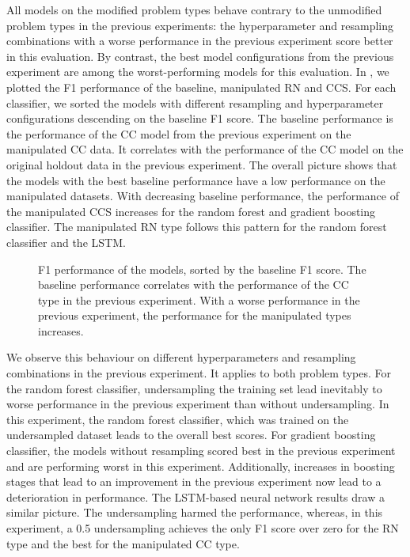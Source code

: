 All models on the modified problem types behave contrary to the unmodified problem types in the previous experiments: the hyperparameter and resampling combinations with a worse performance in the previous experiment score better in this evaluation. By contrast, the best model configurations from the previous experiment are among the worst-performing models for this evaluation. In , we plotted the F1 performance of the baseline, manipulated RN and CCS. For each classifier, we sorted the models with different resampling and hyperparameter configurations descending on the baseline F1 score. The baseline performance is the performance of the CC model from the previous experiment on the manipulated CC data. It correlates with the performance of the CC model on the original holdout data in the previous experiment. The overall picture shows that the models with the best baseline performance have a low performance on the manipulated datasets. With decreasing baseline performance, the performance of the manipulated CCS increases for the random forest and gradient boosting classifier. The manipulated RN type follows this pattern for the random forest classifier and the LSTM. 


\begin{figure}[h]
    \begin{center}
        
    \end{center}
    \caption[F1 performance of the models, sorted by the baseline F1 score.]{F1 performance of the models, sorted by the baseline F1 score. The baseline performance correlates with the performance of the CC type in the previous experiment. With a worse performance in the previous experiment, the performance for the manipulated types increases.}
    \label{fig:rq3_performance_comparison}
\end{figure}

We observe this behaviour on different hyperparameters and resampling combinations in the previous experiment. It applies to both problem types.
For the random forest classifier, undersampling the training set lead inevitably to worse performance in the previous experiment than without undersampling. In this experiment, the random forest classifier, which was trained on the undersampled dataset leads to the overall best scores. For gradient boosting classifier, the models without resampling scored best in the previous experiment and are performing worst in this experiment. Additionally, increases in boosting stages that lead to an improvement in the previous experiment now lead to a deterioration in performance. 
The LSTM-based neural network results draw a similar picture. The undersampling harmed the performance, whereas, in this experiment, a 0.5 undersampling achieves the only F1 score over zero for the RN type and the best for the manipulated CC type.

